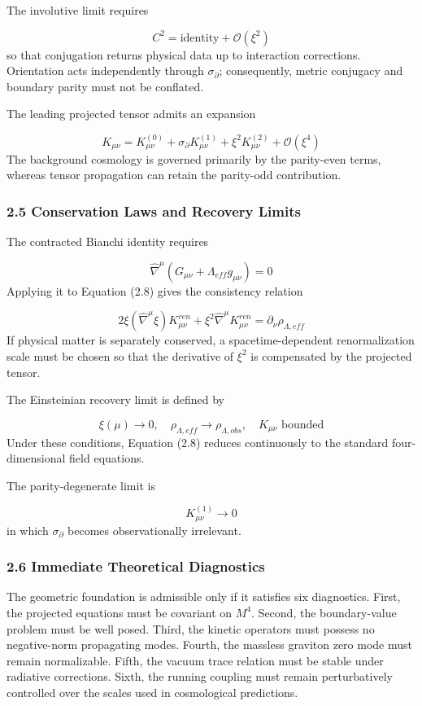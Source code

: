 \documentclass[aps,prd,onecolumn,superscriptaddress,nofootinbib,longbibliography,10pt]{revtex4-2}
\begin{document}
  The involutive limit requires


  \[ C^2 = \text{identity} + \mathcal{O}(\xi^2) \]
  so that conjugation returns physical data up to interaction corrections. Orientation acts independently through \(\sigma_\partial\); consequently, metric conjugacy and boundary parity must not be conflated.


  The leading projected tensor admits an expansion


  \[ K_{\mu\nu} = K^{(0)}_{\mu\nu} + \sigma_\partial K^{(1)}_{\mu\nu} + \xi^2 K^{(2)}_{\mu\nu} + \mathcal{O}(\xi^4) \]
  The background cosmology is governed primarily by the parity-even terms, whereas tensor propagation can retain the parity-odd contribution.



  
\subsubsection*{2.5 Conservation Laws and Recovery Limits}

  The contracted Bianchi identity requires


  \[ \hat{\nabla}^\mu (G_{\mu\nu} + \Lambda_{eff} g_{\mu\nu}) = 0 \]
  Applying it to Equation (2.8) gives the consistency relation


  \[ 2\xi(\hat{\nabla}^\mu \xi) K^{ren}_{\mu\nu} + \xi^2 \hat{\nabla}^\mu K^{ren}_{\mu\nu} = \partial_\nu \rho_{\Lambda,eff} \]
  If physical matter is separately conserved, a spacetime-dependent renormalization scale must be chosen so that the derivative of \(\xi^2\) is compensated by the projected tensor.


  The Einsteinian recovery limit is defined by


  \[ \xi(\mu) \to 0, \quad \rho_{\Lambda,eff} \to \rho_{\Lambda,obs}, \quad K_{\mu\nu}\text{ bounded} \]
  Under these conditions, Equation (2.8) reduces continuously to the standard four-dimensional field equations.


  The parity-degenerate limit is


  \[ K^{(1)}_{\mu\nu} \to 0 \]
  in which \(\sigma_\partial\) becomes observationally irrelevant.



  
\subsubsection*{2.6 Immediate Theoretical Diagnostics}

  The geometric foundation is admissible only if it satisfies six diagnostics. First, the projected equations must be covariant on \(M^4\). Second, the boundary-value problem must be well posed. Third, the kinetic operators must possess no negative-norm propagating modes. Fourth, the massless graviton zero mode must remain normalizable. Fifth, the vacuum trace relation must be stable under radiative corrections. Sixth, the running coupling must remain perturbatively controlled over the scales used in cosmological predictions.
\end{document}
